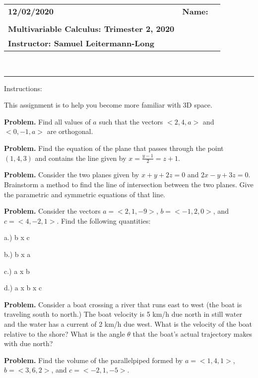 \documentclass[11pt,letterpaper]{article}
\makeatletter
\newcommand{\class}{Multivariable Calculus}
\newcommand{\term}{Trimester 2, 2020}
\newcommand{\instructor}{Samuel Leitermann-Long}
\newcommand{\head}[2]{%
\thispagestyle{empty}
\vspace*{-0.5in}
\noindent\begin{tabular*}{\textwidth}{l @{\extracolsep{\fill}} r @{\extracolsep{6pt}} l}
	\textbf{#1} & \textbf{Name:} & \makebox[8cm]{\hrulefill} \\
	\textbf{#2} & & \\
	\textbf{\class:\; \term} & & \\
	\textbf{Instructor: \instructor}
\end{tabular*} \\
\rule[2ex]{\textwidth}{2pt} %
}
\newcommand{\prob}{\noindent\textbf{Problem. }}
\newcommand{\pspace}{\par\vspace{\baselineskip}}
\makeatother
\begin{document}
\head{12/02/2020}
\textbf{Instructions:} \par \noindent This assignment is to help you become more familiar with 3D space.  \pspace


\prob Find all values of $a$ such that the vectors $<2, 4, a>$ and $<0, -1, a>$ are orthogonal. \pspace


\prob Find the equation of the plane that passes through the point $(1, 4, 3)$ and contains the line given by $x=\frac{y-1}{2} = z+1.$  \pspace


\prob Consider the two planes given by $x+y+2z = 0$ and $2x - y + 3z = 0$. Brainstorm a method to find the line of intersection between the two planes. Give the parametric and symmetric equations of that line.  \pspace


\prob Consider the vectors $a = <2,1,-9>$, $b = <-1,2,0>$, and $c = <4,-2,1>$. Find the following quantities:
\pspace
a.) b x c \pspace
b.) b x a \pspace
c.) a x b \pspace
d.) a x b x c \pspace

\prob Consider a boat crossing a river that runs east to west (the boat is traveling south to north.) The boat velocity is 5 km/h due north in still water and the water has a current of 2 km/h due west. What is the velocity of the boat relative to the shore? What is the angle $\theta$ that the boat's actual trajectory makes with due north?
\pspace

\prob Find the volume of the parallelpiped formed by $a = <1,4,1>$, $b = <3,6,2>$, and $c = <-2,1,-5>.$   \pspace
\end{document}
